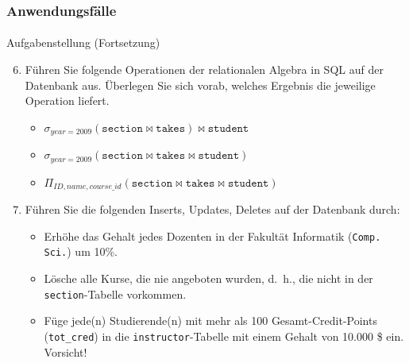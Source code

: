 \begin{frame}[t]
\frametitle{Anwendungsf\"alle}
\framesubtitle{\insertsubsection}
\begin{alertblock}{Aufgabenstellung (Fortsetzung)}
\begin{enumerate}
 \setcounter{enumi}{5}	
 \item\label{U1} F\"uhren Sie folgende Operationen der relationalen Algebra in SQL auf der Datenbank aus.
  \"Uberlegen Sie sich vorab, welches Ergebnis die jeweilige Operation liefert.
  \begin{itemize}
   \item $\sigma_{year= 2009}(\texttt{section}\bowtie\texttt{takes})\bowtie\texttt{student}$
   \item $\sigma_{year= 2009}(\texttt{section}\bowtie\texttt{takes}\bowtie\texttt{student})$
   \item $\Pi_{ID,name,course\_id}(\texttt{section}\bowtie\texttt{takes}\bowtie\texttt{student})$
  \end{itemize}
 \item\label{U2} F\"uhren Sie die folgenden Inserts, Updates, Deletes auf der Datenbank durch:
  \begin{itemize}
   \item Erh\"ohe das Gehalt jedes Dozenten in der Fakult\"at Informatik (\texttt{Comp. Sci.}) um 10\%.
   \item L\"osche alle Kurse, die nie angeboten wurden, d.~h., die nicht in der \texttt{section}-Tabelle vorkommen.
   \item F\"uge jede(n) Studierende(n) mit mehr als 100 Gesamt-Credit-Points (\texttt{tot\_cred}) in die 
    \texttt{instructor}-Tabelle mit einem Gehalt von 10.000 \$ ein. Vorsicht!
  \end{itemize}
\end{enumerate}
\end{alertblock}
\end{frame}

